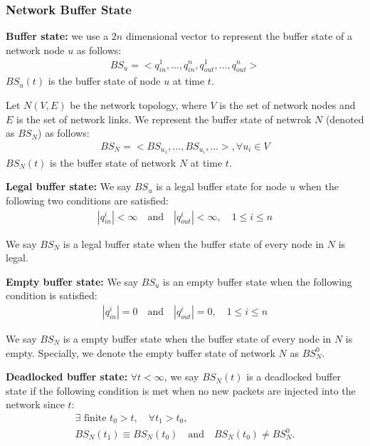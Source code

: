     
   \subsubsection{Network Buffer State}
   
   \textbf{Buffer state:} we use a $2n$ dimensional vector  to represent the buffer state of a network node $u$ as follows: 
   \begin{align}
   BS_u=<q_{in}^{1}, \dots, q_{in}^{n}, q_{out}^{1}, \dots,q_{out}^{n}> \nonumber 
   	\end{align}
   	$BS_u(t)$ is the buffer state of node $u$ at time $t$.
   
   Let $N(V,E)$ be the network topology, where $V$ is the set of network nodes and $E$ is the set of network links. We represent the buffer state of netwrok $N$ (denoted as $BS_N$) as follows:
   \begin{align}
   BS_N=<BS_{u_1},\dots,BS_{u_i},\dots>,\forall u_i \in V \nonumber 
   \end{align}
   $BS_N(t)$ is the buffer state of network $N$ at time $t$.
   
   \textbf{Legal buffer state:} We say $BS_u$ is a legal buffer state for node $u$ when the following two conditions are satisfied:
   \begin{align} \label{eqn:legalstatecon}
    |q_{in}^{i}|<\infty\quad  \text{and}\quad   |q_{out}^{i}|<\infty, \quad 1\leq i \leq n
   \end{align}
   
   We say $BS_N$ is a legal buffer state when the buffer state of every node in $N$ is legal.
   
   \textbf{Empty buffer state:} We say $BS_u$ is an empty buffer state when the following condition is satisfied:
    \begin{align} \label{eqn:emptystatecon}
    |q_{in}^{i}|=0\quad  \text{and}\quad   |q_{out}^{i}|=0, \quad 1\leq i \leq n 
    \end{align}
    
    We say $BS_N$ is a empty buffer state when the buffer state of every node in $N$ is empty. Specially, we denote the empty buffer state of network $N$ as $BS^0_N$.
    
  \textbf{Deadlocked buffer state:} $\forall t< \infty$, we say $BS_N(t)$ is a deadlocked buffer state if the following condition is met when no new packets are injected into the network since $t$:
  \begin{align} \label{eqn:deadlockstatedef}
  \exists \text{ finite } t_0 > t, \quad \forall t_1>t_0, \nonumber\\
  BS_N(t_1)\equiv BS_N(t_0) \quad \text{and} \quad BS_N(t_0) \neq BS^0_N.
  \end{align}
  
